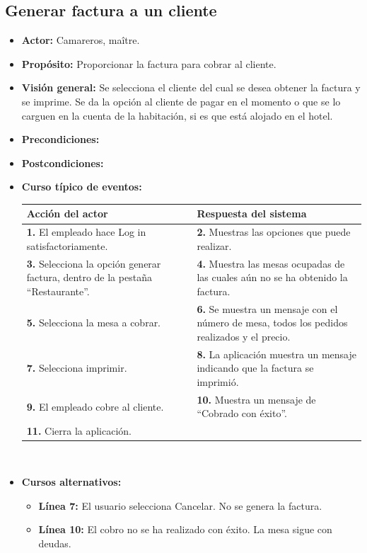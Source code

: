 \documentclass[spanish,a4paper,11pt, twoside]{report}	%
\begin{document}

		\subsection{Generar factura a un cliente}
			\begin{itemize}
			\item \textbf{Actor:} Camareros, maître.
			\item \textbf{Propósito: } Proporcionar la factura para cobrar al cliente.
			\item \textbf{Visión general:} Se selecciona el cliente del cual se desea obtener la factura y se imprime. Se da la opción al cliente de pagar en el momento o que se lo carguen en la cuenta de la habitación, si es que está alojado en el hotel.
			\item \textbf{Precondiciones:} 
			\item \textbf{Postcondiciones:} 
			\item \textbf{Curso típico de eventos:} 	\\
				\begin{tabular}{|p{6cm}||p{6cm}|}
				\hline
				\textbf{Acción del actor} & \textbf{Respuesta del sistema} \\ \hline \hline
				\textbf{1.}   El empleado hace Log in satisfactoriamente. & \textbf{2.} Muestras las opciones que puede realizar. \\ \hline
				\textbf{3.} Selecciona la opción generar factura, dentro de la pestaña “Restaurante''. & \textbf{4.} Muestra las mesas ocupadas de las cuales aún no se ha obtenido la factura. \\ \hline
				\textbf{5.} Selecciona la mesa a cobrar.	& \textbf{6.} Se muestra un mensaje con el número de mesa, todos los pedidos realizados y el precio. \\ \hline
				\textbf{7.} Selecciona imprimir.	& \textbf{8.} La aplicación muestra un mensaje indicando que la factura se imprimió. \\ \hline
				\textbf{9.} El empleado cobre al cliente.	& \textbf{10.} Muestra un mensaje de “Cobrado con éxito''. \\ \hline
				\textbf{11.} Cierra la aplicación. &  \\ \hline
			\end{tabular}
			\\
			\item \textbf{Cursos alternativos:} 
			\begin{itemize}
			\item  \textbf{Línea 7:} El usuario selecciona Cancelar. No se genera la factura.
			\item  \textbf{Línea 10:} El cobro no se ha realizado con éxito. La mesa sigue con deudas.
			\end {itemize}
		\end {itemize}
		
\end{document}
